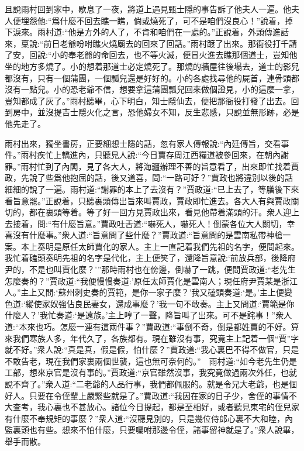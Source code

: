 \begin{parag}
    且說雨村回到家中，歇息了一夜，將道上遇見甄士隱的事告訴了他夫人一遍。他夫人便埋怨他:“爲什麼不回去瞧一瞧，倘或燒死了，可不是咱們沒良心！”說着，掉下淚來。雨村道:“他是方外的人了，不肯和咱們在一處的。”正說着，外頭傳進話來，稟說:“前日老爺吩咐瞧火燒廟去的回來了回話。”雨村踱了出來。那衙役打千請了安，回說:“小的奉老爺的命回去，也不等火滅，便冒火進去瞧那個道士，豈知他坐的地方多燒了。小的想着那道士必定燒死了。那燒的牆屋往後塌去，道士的影兒都沒有，只有一個蒲團，一個瓢兒還是好好的。小的各處找尋他的屍首，連骨頭都沒有一點兒。小的恐老爺不信，想要拿這蒲團瓢兒回來做個證見，小的這麼一拿，豈知都成了灰了。”雨村聽畢，心下明白，知士隱仙去，便把那衙役打發了出去。回到房中，並沒提吉士隱火化之言，恐他婦女不知，反生悲感，只說並無形跡，必是他先走了。
\end{parag}


\begin{parag}
    雨村出來，獨坐書房，正要細想士隱的話，忽有家人傳報說:“內廷傳旨，交看事件。”雨村疾忙上轎進內，只聽見人說:“今日賈存周江西糧道被參回來，在朝內謝罪。”雨村忙到了內閣，見了各大人，將海疆辦理不善的旨意看了，出來即忙找着賈政，先說了些爲他抱屈的話，後又道喜，問:“一路可好？”賈政也將違別以後的話細細的說了一遍。雨村道:“謝罪的本上了去沒有？”賈政道:“已上去了，等膳後下來看旨意罷。”正說着，只聽裏頭傳出旨來叫賈政，賈政即忙進去。各大人有與賈政關切的，都在裏頭等着。等了好一回方見賈政出來，看見他帶着滿頭的汗。衆人迎上去接着，問:“有什麼旨意。”賈政吐舌道:“嚇死人，嚇死人！倒蒙各位大人關切，幸喜沒有什麼事。”衆人道:“旨意問了些什麼？”賈政道:“旨意問的是雲南私帶神槍一案。本上奏明是原任太師賈化的家人。主上一直記着我們先祖的名字，便問起來。我忙着磕頭奏明先祖的名字是代化，主上便笑了，還降旨意說:‘前放兵部，後降府尹的，不是也叫賈化麼？’”那時雨村也在傍邊，倒嚇了一跳，便問賈政道:“老先生怎麼奏的？”賈政道:“我便慢慢奏道:’原任太師賈化是雲南人；現任府尹賈某是浙江人。”主上又問:‘蘇州刺史奏的賈範，是你一家子麼？’我又磕頭奏道:‘是。’主上便變色道:‘縱使家奴強佔良民妻女，還成事麼？’我一句不敢奏。主上又問道:‘賈範是你什麼人？’我忙奏道:‘是遠族。’主上哼了一聲，降旨叫了出來。可不是詫事！”衆人道:“本來也巧。怎麼一連有這兩件事？”賈政道:“事倒不奇，倒是都姓賈的不好。算來我們寒族人多，年代久了，各族都有。現在雖沒有事，究竟主上記着一個“賈”字就不好。”衆人說:“真是真，假是假，怕什麼？”賈政道:“我心裏巴不得不做官，只是不敢告老，現在我們家裏兩個世襲，這也無可奈何的。”　雨村道:“如今老先生仍是工部，想來京官是沒有事的。”賈政道:“京官雖然沒事，我究竟做過兩次外任，也就說不齊了。”衆人道:“二老爺的人品行事，我們都佩服的。就是令兄大老爺，也是個好人。只要在令侄輩上嚴緊些就是了。”賈政道:“我因在家的日子少，舍侄的事情不大查考，我心裏也不甚放心。諸位今日提起，都是至相好，或者聽見東宅的侄兒家有什麼不奉規矩的事麼？”衆人道:“沒聽見別的，只是幾位侍郎心裏不大和睦，內監裏頭也有些。想來不怕什麼，只要囑咐那邊令侄，諸事留神就是了。”衆人說畢，舉手而散。
\end{parag}


